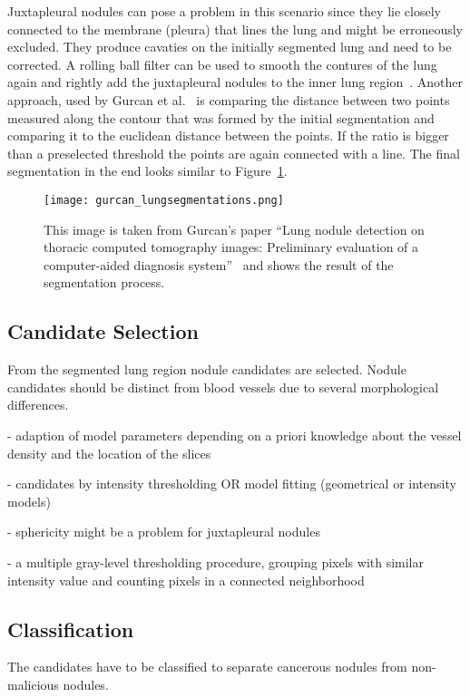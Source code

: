\documentclass[main.tex]{subfiles}
\begin{document}
Juxtapleural nodules can pose a problem in this scenario since they lie closely connected to the membrane (pleura) that lines the lung and might be erroneously excluded. They produce cavaties on the initially segmented lung and need to be corrected. A rolling ball filter can be used to smooth the contures of the lung again and rightly add the juxtapleural nodules to the inner lung region~\cite{armato1999computerized}. Another approach, used by Gurcan et al.~\cite{gurcan2002lung} is comparing the distance between two points measured along the contour that was formed by the initial segmentation and comparing it to the euclidean distance between the points. If the ratio is bigger than a preselected threshold the points are again connected with a line. The final segmentation in the end looks similar to Figure~\ref{fig:segmentation}.

\begin{figure}[ht]
\centering
\texttt{[image: gurcan\_lungsegmentations.png]}
\caption{This image is taken from Gurcan's paper ``Lung nodule detection on thoracic computed tomography images: Preliminary evaluation of a computer-aided diagnosis system''~\cite{gurcan2002lung} and shows the result of the segmentation process.}
\label{fig:segmentation}
\end{figure}


\subsection{Candidate Selection}
From the segmented lung region nodule candidates are selected. Nodule candidates should be distinct from blood vessels due to several morphological differences. 

- adaption of model parameters depending on a priori knowledge about the vessel density and the location of the slices

- candidates by intensity thresholding OR model fitting (geometrical or intensity models)

- sphericity might be a problem for juxtapleural nodules

- a multiple gray-level thresholding procedure, grouping pixels with similar intensity value and counting pixels in a connected neighborhood


\subsection{Classification}
The candidates have to be classified to separate cancerous nodules from non-malicious nodules. 
\end{document}
